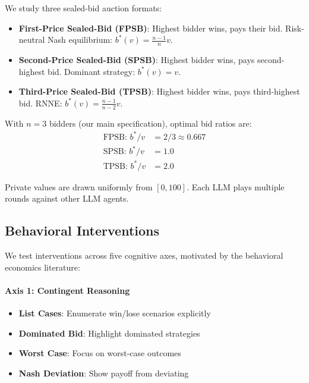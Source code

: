 \documentclass[12pt]{article}
\begin{document}
We study three sealed-bid auction formats:
\begin{itemize}
    \item \textbf{First-Price Sealed-Bid (FPSB)}: Highest bidder wins, pays their bid. Risk-neutral Nash equilibrium: $b^*(v) = \frac{n-1}{n}v$.
    \item \textbf{Second-Price Sealed-Bid (SPSB)}: Highest bidder wins, pays second-highest bid. Dominant strategy: $b^*(v) = v$.
    \item \textbf{Third-Price Sealed-Bid (TPSB)}: Highest bidder wins, pays third-highest bid. RNNE: $b^*(v) = \frac{n-1}{n-2}v$.
\end{itemize}

With $n=3$ bidders (our main specification), optimal bid ratios are:
\begin{align}
    \text{FPSB: } b^*/v &= 2/3 \approx 0.667 \\
    \text{SPSB: } b^*/v &= 1.0 \\
    \text{TPSB: } b^*/v &= 2.0
\end{align}

Private values are drawn uniformly from $[0, 100]$. Each LLM plays multiple rounds against other LLM agents.

\subsection{Behavioral Interventions}

We test interventions across five cognitive axes, motivated by the behavioral economics literature:

\paragraph{Axis 1: Contingent Reasoning}
\begin{itemize}
    \item \textbf{List Cases}: Enumerate win/lose scenarios explicitly
    \item \textbf{Dominated Bid}: Highlight dominated strategies
    \item \textbf{Worst Case}: Focus on worst-case outcomes
    \item \textbf{Nash Deviation}: Show payoff from deviating
\end{itemize}
\end{document}
